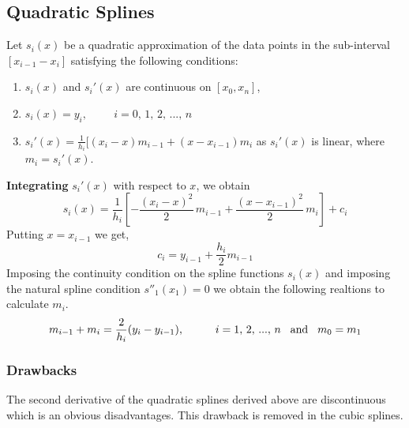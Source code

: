 \documentclass[aima203_lecturenotes_ku.tex]{subfiles}
\begin{document}
\subsection{Quadratic Splines}
Let $s_i(x)$ be a quadratic approximation of the data points in the sub-interval $[x_{i-1} -x_i]$ satisfying the following conditions:
\begin{enumerate}
\item $s_i(x)$ and $s_i'(x)$ are continuous on $[x_0,x_n]$,
\item $s_i(x)=y_i, \hspace{1cm} i=0,\, 1,\, 2, \, ..., \, n$
\item $s_i'(x) = \frac{1}{h_i} [ (x_i -x)m_{i-1} + (x-x_{i-1})m_i$ as $s_i'(x)$ is linear, where $m_i = s_i'(x)$.
\end{enumerate}
\textbf{Integrating} $s_i'(x)$ with respect to $x$, we obtain
\begin{equation}
  s_i(x) = \frac{1}{h_i} \left [ -\frac{(x_i -x)^2}{2}\, m_{i-1} + \frac{(x-x_{i-1})^2}{2} \, m_i \right ] + c_i
\end{equation}
Putting $x=x_{i-1}$ we get,
\begin{equation}
  c_i = y_{i-1} + \frac{h_i}{2}m_{i-1}
\end{equation}
Imposing the continuity condition on the spline functions $s_i(x)$ and imposing the natural spline condition $s''_1(x_1)=0$ we obtain the following realtions to calculate $m_i$.
\begin{equation}
  m_{i-1} +m_{i} = \frac{2}{h_i}(y_i -y_{i-1}), \hspace{1cm} i = 1,\, 2, \, ..., \, n \hspace{3mm} \text{and} \hspace{3mm} m_0 = m_1
\end{equation}

\subsubsection{Drawbacks}
The second derivative of the quadratic splines derived above are discontinuous which is an obvious disadvantages. This drawback is removed in the cubic splines.
\end{document}
